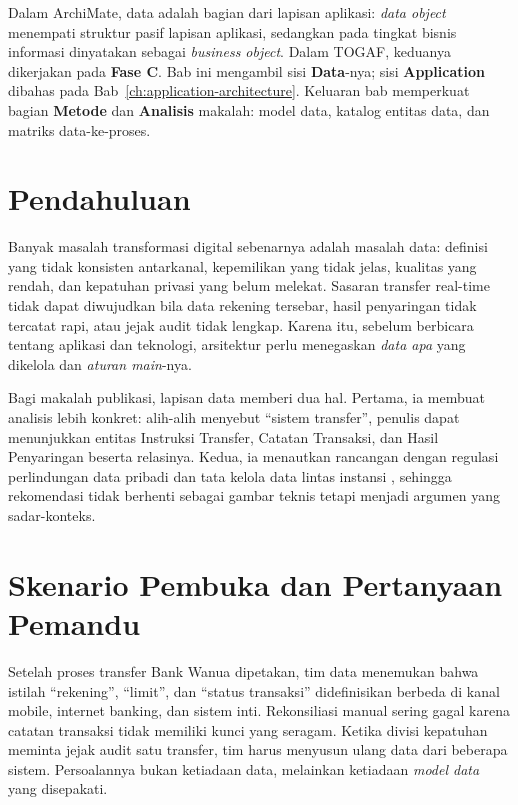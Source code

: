 Dalam ArchiMate, data adalah bagian dari lapisan aplikasi: \emph{data object}
menempati struktur pasif lapisan aplikasi, sedangkan pada tingkat bisnis
informasi dinyatakan sebagai \emph{business object}. Dalam TOGAF, keduanya
dikerjakan pada \textbf{Fase C}. Bab ini mengambil sisi \textbf{Data}-nya; sisi
\textbf{Application} dibahas pada Bab~\ref{ch:application-architecture}. Keluaran
bab memperkuat bagian \textbf{Metode} dan \textbf{Analisis} makalah: model data,
katalog entitas data, dan matriks data-ke-proses.

\section{Pendahuluan}

Banyak masalah transformasi digital sebenarnya adalah masalah data: definisi yang
tidak konsisten antarkanal, kepemilikan yang tidak jelas, kualitas yang rendah,
dan kepatuhan privasi yang belum melekat. Sasaran transfer real-time tidak dapat
diwujudkan bila data rekening tersebar, hasil penyaringan tidak tercatat rapi,
atau jejak audit tidak lengkap. Karena itu, sebelum berbicara tentang aplikasi
dan teknologi, arsitektur perlu menegaskan \emph{data apa} yang dikelola dan
\emph{aturan main}-nya.

Bagi makalah publikasi, lapisan data memberi dua hal. Pertama, ia membuat analisis
lebih konkret: alih-alih menyebut ``sistem transfer'', penulis dapat menunjukkan
entitas Instruksi Transfer, Catatan Transaksi, dan Hasil Penyaringan beserta
relasinya. Kedua, ia menautkan rancangan dengan regulasi perlindungan data
pribadi \cite{uupdp2022} dan tata kelola data lintas instansi \cite{satudata},
sehingga rekomendasi tidak berhenti sebagai gambar teknis tetapi menjadi argumen
yang sadar-konteks.

\section{Skenario Pembuka dan Pertanyaan Pemandu}

Setelah proses transfer Bank Wanua dipetakan, tim data menemukan bahwa istilah
``rekening'', ``limit'', dan ``status transaksi'' didefinisikan berbeda di kanal
mobile, internet banking, dan sistem inti. Rekonsiliasi manual sering gagal karena
catatan transaksi tidak memiliki kunci yang seragam. Ketika divisi kepatuhan
meminta jejak audit satu transfer, tim harus menyusun ulang data dari beberapa
sistem. Persoalannya bukan ketiadaan data, melainkan ketiadaan \emph{model data}
yang disepakati.

